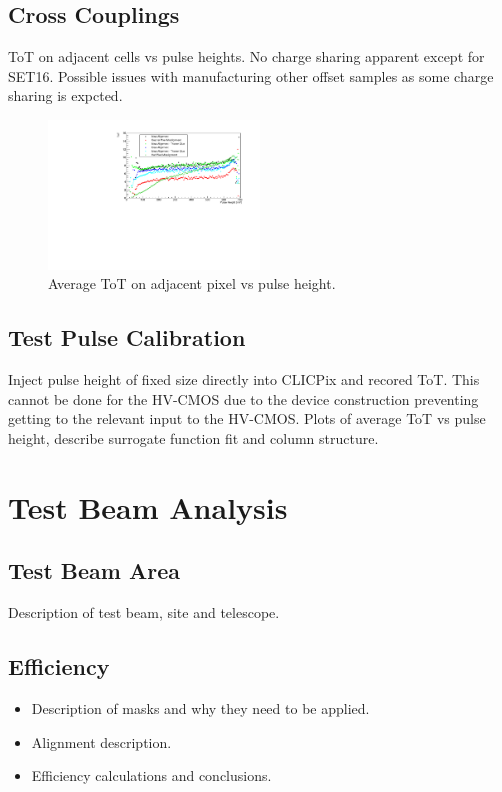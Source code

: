 \subsection{Cross Couplings}
ToT on adjacent cells vs pulse heights.  No charge sharing apparent except for SET16.  Possible issues with manufacturing other offset samples as some charge sharing is expcted.

\begin{figure}
\centering
\includegraphics[width=0.5\textwidth]{CLICdpVertex/Plots/ToT_X_vs_PulseHeight.pdf}
\caption[Average ToT on adjacent pixel vs pulse height.]{Average ToT on adjacent pixel vs pulse height.}
\label{fig:avgtotadjvspulseheight}
\end{figure}

\subsection{Test Pulse Calibration}
Inject pulse height of fixed size directly into CLICPix and recored ToT.  This cannot be done for the HV-CMOS due to the device construction preventing getting to the relevant input to the HV-CMOS.  Plots of average ToT vs pulse height, describe surrogate function fit and column structure.  

\section{Test Beam Analysis}
\subsection{Test Beam Area}
Description of test beam, site and telescope.

\subsection{Efficiency}

\begin{itemize}
\item Description of masks and why they need to be applied.
\item Alignment description.
\item Efficiency calculations and conclusions. 
\end{itemize}

